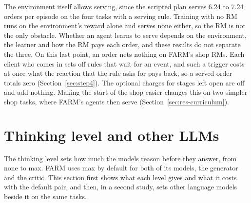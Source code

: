 \documentclass[11pt,english,listoffigures,listoftables]{tfgetsinf}
\begin{document}
The environment itself allows serving, since the scripted plan serves 6.24 to 7.24 orders per episode on the four tasks with a serving rule. Training with no RM runs on the environment's reward alone and serves none either, so the RM is not the only obstacle. Whether an agent learns to serve depends on the environment, the learner and how the RM pays each order, and these results do not separate the three. On this last point, an order nets nothing on FARM's shop RMs. Each client who comes in sets off rules that wait for an event, and such a trigger costs at once what the reaction that the rule asks for pays back, so a served order totals zero (Section~\ref{sec:step4}). The optional charges for stages left open are off and add nothing.
Making the start of the shop easier changes this on two simpler shop tasks, where FARM's agents then serve (Section~\ref{sec:res-curriculum}).


\section{Thinking level and other LLMs}
\label{sec:res-thinking}
\label{sec:res-models}

The thinking level sets how much the models reason before they answer, from none to max. FARM uses max by default for both of its models, the generator and the critic. This section first shows what each level gives and what it costs with the default pair, and then, in a second study, sets other language models beside it on the same tasks.
\end{document}
